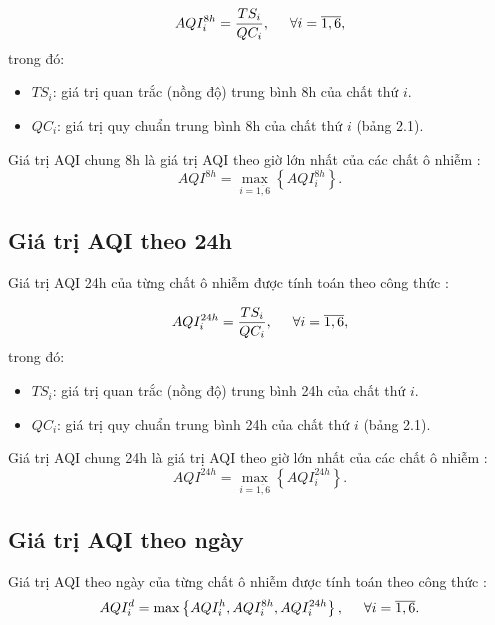 \documentclass[14pt]{extreport}
\theoremstyle{definition}
\theoremstyle{plain}
\theoremstyle{remark}
\begin{document}
\begin{equation}
AQI_i^{8h} = \dfrac{TS_i}{QC_i}, \hspace{0.5cm}  \forall i=\overline{1,6},
\end{equation}
trong đó:	 
\begin{itemize}
\item $TS_i$: giá trị quan trắc (nồng độ) trung bình 8h của chất thứ $i$.
\item $QC_i$: giá trị quy chuẩn trung bình 8h của chất thứ $i$ (bảng 2.1).
\end{itemize}

Giá trị AQI chung 8h là giá trị AQI theo giờ lớn nhất của các chất ô nhiễm \cite{TCMT2011}:
\begin{equation}
AQI^{8h} = \max_{i=\overline{1,6}}\left\lbrace AQI_i^{8h}\right\rbrace.
\end{equation}


\subsection{Giá trị AQI theo 24h}
Giá trị AQI 24h của từng chất ô nhiễm được tính toán theo công thức \cite{TCMT2011}:

\begin{equation}
AQI_i^{24h} = \dfrac{TS_i}{QC_i}, \hspace{0.5cm}  \forall i=\overline{1,6},
\end{equation}
trong đó:	 
\begin{itemize}
\item $TS_i$: giá trị quan trắc (nồng độ) trung bình 24h của chất thứ $i$.
\item $QC_i$: giá trị quy chuẩn trung bình 24h của chất thứ $i$ (bảng 2.1).
\end{itemize}

Giá trị AQI chung 24h là giá trị AQI theo giờ lớn nhất của các chất ô nhiễm \cite{TCMT2011}:
\begin{equation}
AQI^{24h} = \max_{i=\overline{1,6}}\left\lbrace AQI_i^{24h}\right\rbrace.
\end{equation}

\subsection{Giá trị AQI theo ngày}
Giá trị AQI theo ngày của từng chất ô nhiễm được tính toán theo công thức \cite{TCMT2011}:
\begin{equation}
AQI_i^d = \max\left\lbrace AQI_i^{h}, AQI_i^{8h}, AQI_i^{24h} \right\rbrace, \hspace{0.5cm} \forall i=\overline{1,6}.
\end{equation}
\end{document}
